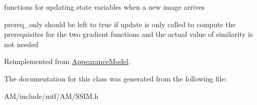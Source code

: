 functions for updating state variables when a new image arrives 

prereq\-\_\-only should be left to true if update is only called to compute the prerequisites for the two gradient functions and the actual value of similarity is not needed 

Reimplemented from \hyperlink{classAppearanceModel_a06136ecd903e85ed2007da2c7b12bd58}{Appearance\-Model}.



The documentation for this class was generated from the following file\-:\begin{DoxyCompactItemize}
\item 
A\-M/include/mtf/\-A\-M/S\-S\-I\-M.\-h\end{DoxyCompactItemize}
